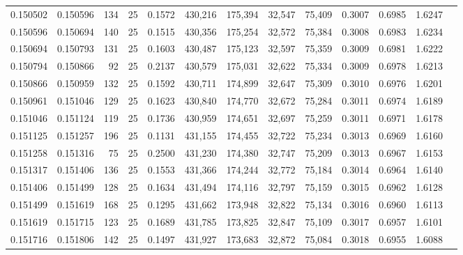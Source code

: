 \begin{tabular}{rrrrrrrrrrrrr}
0.150502 & 0.150596 &   134 &  25 &                                     0.1572 & 430,216 & 175,394 &  32,547 &  75,409 & 0.3007 & 0.6985 & 1.6247 \\
0.150596 & 0.150694 &   140 &  25 &                                     0.1515 & 430,356 & 175,254 &  32,572 &  75,384 & 0.3008 & 0.6983 & 1.6234 \\
0.150694 & 0.150793 &   131 &  25 &                                     0.1603 & 430,487 & 175,123 &  32,597 &  75,359 & 0.3009 & 0.6981 & 1.6222 \\
0.150794 & 0.150866 &    92 &  25 &                                     0.2137 & 430,579 & 175,031 &  32,622 &  75,334 & 0.3009 & 0.6978 & 1.6213 \\
0.150866 & 0.150959 &   132 &  25 &                                     0.1592 & 430,711 & 174,899 &  32,647 &  75,309 & 0.3010 & 0.6976 & 1.6201 \\
0.150961 & 0.151046 &   129 &  25 &                                     0.1623 & 430,840 & 174,770 &  32,672 &  75,284 & 0.3011 & 0.6974 & 1.6189 \\
0.151046 & 0.151124 &   119 &  25 &                                     0.1736 & 430,959 & 174,651 &  32,697 &  75,259 & 0.3011 & 0.6971 & 1.6178 \\
0.151125 & 0.151257 &   196 &  25 &                                     0.1131 & 431,155 & 174,455 &  32,722 &  75,234 & 0.3013 & 0.6969 & 1.6160 \\
0.151258 & 0.151316 &    75 &  25 &                                     0.2500 & 431,230 & 174,380 &  32,747 &  75,209 & 0.3013 & 0.6967 & 1.6153 \\
0.151317 & 0.151406 &   136 &  25 &                                     0.1553 & 431,366 & 174,244 &  32,772 &  75,184 & 0.3014 & 0.6964 & 1.6140 \\
0.151406 & 0.151499 &   128 &  25 &                                     0.1634 & 431,494 & 174,116 &  32,797 &  75,159 & 0.3015 & 0.6962 & 1.6128 \\
0.151499 & 0.151619 &   168 &  25 &                                     0.1295 & 431,662 & 173,948 &  32,822 &  75,134 & 0.3016 & 0.6960 & 1.6113 \\
0.151619 & 0.151715 &   123 &  25 &                                     0.1689 & 431,785 & 173,825 &  32,847 &  75,109 & 0.3017 & 0.6957 & 1.6101 \\
0.151716 & 0.151806 &   142 &  25 &                                     0.1497 & 431,927 & 173,683 &  32,872 &  75,084 & 0.3018 & 0.6955 & 1.6088 \\

\end{tabular}
